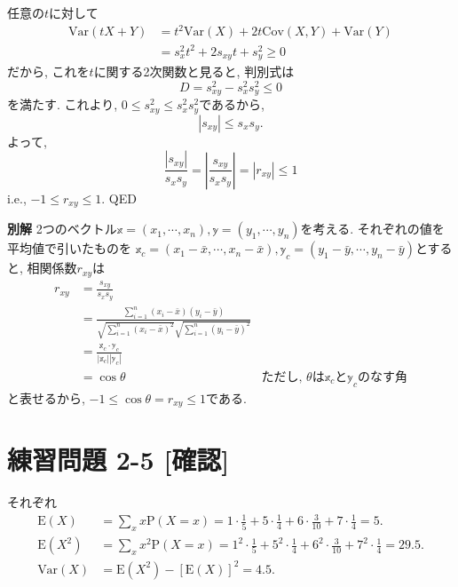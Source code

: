 \documentclass[
]{book}
\begin{document}
任意の\(t\)に対して
\[
\begin{aligned}
    \text{Var}(tX+Y) &= t^2\text{Var}(X) + 2t\text{Cov}(X, Y) + \text{Var}(Y) \\
                     &= s_x^2t^2 + 2s_{xy}t + s_y^2 \geq 0
\end{aligned}
\]
だから, これを\(t\)に関する2次関数と見ると, 判別式は
\[
D = s_{xy}^2 - s_x^2s_y^2 \leq 0
\]
を満たす.
これより, \(0 \leq s_{xy}^2 \leq s_x^2s_y^2\)であるから,
\[
|s_{xy}| \leq s_xs_y.
\]
よって,
\[
\frac{|s_{xy}|}{s_xs_y} = \left|\frac{s_{xy}}{s_xs_y}\right| = |r_{xy}| \leq 1
\]
i.e., \(-1 \leq r_{xy} \leq 1\). QED

\textbf{別解} 2つのベクトル\(\mathbb{x} = (x_1, \cdots, x_n), \mathbb{y} = (y_1, \cdots, y_n)\)を考える.
それぞれの値を平均値で引いたものを \(\mathbb{x}_c = (x_1 - \bar{x}, \cdots, x_n - \bar{x}), \mathbb{y}_c = (y_1 - \bar{y}, \cdots, y_n - \bar{y})\)とすると,
相関係数\(r_{xy}\)は
\[
\begin{aligned}
r_{xy} &= \frac{s_{xy}}{s_xs_y} \\
       &= \frac{\sum_{i=1}^n (x_i - \bar{x})(y_i - \bar{y})}{\sqrt{\sum_{i=1}^n (x_i - \bar{x})^2}\sqrt{\sum_{i=1}^n (y_i - \bar{y})^2}} \\
       &= \frac{\mathbb{x}_c\cdot\mathbb{y}_c}{|\mathbb{x}_c||\mathbb{y}_c|} \\
       &= \cos\theta & \text{ただし, $\theta$は$\mathbb{x}_c$と$\mathbb{y}_c$のなす角}
\end{aligned}
\]
と表せるから, \(-1 \leq \cos\theta = r_{xy} \leq 1\)である.

\hypertarget{ux7df4ux7fd2ux554fux984c-2-5-ux78baux8a8d}{%
\section*{練習問題 2-5 {[}確認{]}}\label{ux7df4ux7fd2ux554fux984c-2-5-ux78baux8a8d}}

それぞれ
\[
\begin{aligned}
  \text{E}(X)   &= \sum_x x\text{P}(X=x) = 1\cdot\frac{1}{5} + 5\cdot\frac{1}{4} + 6\cdot\frac{3}{10} + 7\cdot\frac{1}{4} = 5. \\
  \text{E}(X^2) &= \sum_x x^2\text{P}(X=x) = 1^2\cdot\frac{1}{5} + 5^2\cdot\frac{1}{4} + 6^2\cdot\frac{3}{10} + 7^2\cdot\frac{1}{4} = 29.5. \\
  \text{Var}(X)   &= \text{E}(X^2) - [\text{E}(X)]^2 = 4.5.
\end{aligned}
\]
\end{document}

